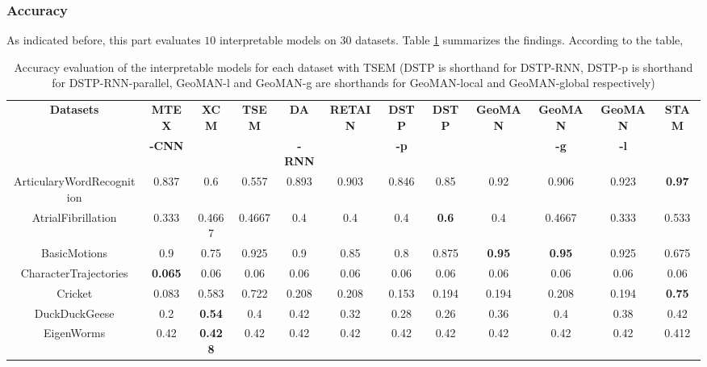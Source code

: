\documentclass{svproc}
\begin{document}
\subsubsection{Accuracy}
As indicated before, this part evaluates $10$ interpretable models on $30$ datasets. Table \ref{tab:ueaacc1} summarizes the findings. According to the table,
	\begin{table}[ht!]
    \caption{Accuracy evaluation of the interpretable models for each dataset with TSEM (DSTP is shorthand for DSTP-RNN, DSTP-p is shorthand for DSTP-RNN-parallel, GeoMAN-l and GeoMAN-g are shorthands for GeoMAN-local and GeoMAN-global respectively)}
    \centering
    \small\addtolength{\tabcolsep}{-6pt}
    \label{tab:ueaacc1}
    \begin{adjustbox}{width=1.3\textwidth}
    \begin{tabular}{||c@{\hskip 0.1in}c@{\hskip 0.1in}c@{\hskip 0.1in}c@{\hskip 0.1in}c@{\hskip 0.1in}c@{\hskip 0.1in}c@{\hskip 0.1in}c@{\hskip 0.1in}c@{\hskip 0.1in}c@{\hskip 0.1in}c@{\hskip 0.1in}c||} 
    \hline
    {\textbf{Datasets}} & \textbf{MTEX} &  {\textbf{XCM}} & {\textbf{TSEM}} & \textbf{DA} &  {\textbf{RETAIN}} & \textbf{DSTP} &  {\textbf{DSTP}} &  {\textbf{GeoMAN}} & \textbf{GeoMAN} & \textbf{GeoMAN} &  {\textbf{STAM}} \\ [0.5ex] 
    & \textbf{-CNN} & & & \textbf{-RNN} &  & \textbf{-p} &  &  & \textbf{-g} & \textbf{-l} &  \\ [0.5ex] 
    \hline\hline
    ArticularyWordRecognition &  0.837 & 0.6 & 0.557 & 0.893 & 0.903 & 0.846 & 0.85 & 0.92 & 0.906 & 0.923 & \textbf{0.97} \\ 
    \hline
    AtrialFibrillation &  0.333 & 0.4667 & 0.4667 & 0.4 & 0.4 & 0.4 & \textbf{0.6} & 0.4 & 0.4667 & 0.333 & 0.533 \\ 
    \hline
    BasicMotions &  0.9 & 0.75 & 0.925 & 0.9 & 0.85 & 0.8 & 0.875 & \textbf{0.95} & \textbf{0.95} & 0.925 & 0.675 \\ 
    \hline
    CharacterTrajectories &  \textbf{0.065} & 0.06 & 0.06 & 0.06 & 0.06 & 0.06 & 0.06 & 0.06 & 0.06 & 0.06 & 0.06 \\     \hline
    Cricket &  0.083 & 0.583 & 0.722 & 0.208 & 0.208 & 0.153 & 0.194 & 0.194 & 0.208 & 0.194 & \textbf{0.75} \\ 
    \hline
    DuckDuckGeese &  0.2 & \textbf{0.54} &0.4& 0.42 & 0.32 & 0.28 & 0.26 & 0.36 & 0.4 & 0.38 & 0.42 \\ 
    \hline
    EigenWorms &  0.42 & \textbf{0.428} & 0.42 & 0.42 & 0.42 & 0.42 & 0.42 & 0.42 & 0.42 & 0.42 & 0.412 \\ 

\end{tabular}
\end{adjustbox}
\end{table}
\end{document}

